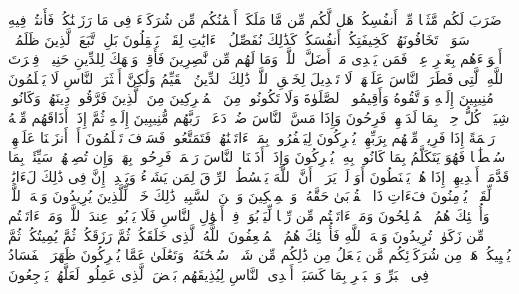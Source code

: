 \stopbuffer
\startbuffer[\q:30:28]
ضَرَبَ لَكُم مَّثَلࣰا مِّنۡ أَنفُسِكُمۡۖ هَل لَّكُم مِّن مَّا مَلَكَتۡ أَیۡمَٰنُكُم مِّن شُرَكَاۤءَ فِی مَا رَزَقۡنَٰكُمۡ فَأَنتُمۡ فِیهِ سَوَاۤءࣱ تَخَافُونَهُمۡ كَخِیفَتِكُمۡ أَنفُسَكُمۡۚ كَذَٰلِكَ نُفَصِّلُ ٱلۡءَایَٰتِ لِقَوۡمࣲ یَعۡقِلُونَ%
\stopbuffer
\startbuffer[\q:30:29]
بَلِ ٱتَّبَعَ ٱلَّذِینَ ظَلَمُوۤا۟ أَهۡوَاۤءَهُم بِغَیۡرِ عِلۡمࣲۖ فَمَن یَهۡدِی مَنۡ أَضَلَّ ٱللَّهُۖ وَمَا لَهُم مِّن نَّٰصِرِینَ%
\stopbuffer
\startbuffer[\q:30:30]
فَأَقِمۡ وَجۡهَكَ لِلدِّینِ حَنِیفࣰاۚ فِطۡرَتَ ٱللَّهِ ٱلَّتِی فَطَرَ ٱلنَّاسَ عَلَیۡهَاۚ لَا تَبۡدِیلَ لِخَلۡقِ ٱللَّهِۚ ذَٰلِكَ ٱلدِّینُ ٱلۡقَیِّمُ وَلَٰكِنَّ أَكۡثَرَ ٱلنَّاسِ لَا یَعۡلَمُونَ%
\stopbuffer
\startbuffer[\q:30:31]
۞ مُنِیبِینَ إِلَیۡهِ وَٱتَّقُوهُ وَأَقِیمُوا۟ ٱلصَّلَوٰةَ وَلَا تَكُونُوا۟ مِنَ ٱلۡمُشۡرِكِینَ%
\stopbuffer
\startbuffer[\q:30:32]
مِنَ ٱلَّذِینَ فَرَّقُوا۟ دِینَهُمۡ وَكَانُوا۟ شِیَعࣰاۖ كُلُّ حِزۡبِۭ بِمَا لَدَیۡهِمۡ فَرِحُونَ%
\stopbuffer
\startbuffer[\q:30:33]
وَإِذَا مَسَّ ٱلنَّاسَ ضُرࣱّ دَعَوۡا۟ رَبَّهُم مُّنِیبِینَ إِلَیۡهِ ثُمَّ إِذَاۤ أَذَاقَهُم مِّنۡهُ رَحۡمَةً إِذَا فَرِیقࣱ مِّنۡهُم بِرَبِّهِمۡ یُشۡرِكُونَ%
\stopbuffer
\startbuffer[\q:30:34]
لِیَكۡفُرُوا۟ بِمَاۤ ءَاتَیۡنَٰهُمۡۚ فَتَمَتَّعُوا۟ فَسَوۡفَ تَعۡلَمُونَ%
\stopbuffer
\startbuffer[\q:30:35]
أَمۡ أَنزَلۡنَا عَلَیۡهِمۡ سُلۡطَٰنࣰا فَهُوَ یَتَكَلَّمُ بِمَا كَانُوا۟ بِهِۦ یُشۡرِكُونَ%
\stopbuffer
\startbuffer[\q:30:36]
وَإِذَاۤ أَذَقۡنَا ٱلنَّاسَ رَحۡمَةࣰ فَرِحُوا۟ بِهَاۖ وَإِن تُصِبۡهُمۡ سَیِّئَةُۢ بِمَا قَدَّمَتۡ أَیۡدِیهِمۡ إِذَا هُمۡ یَقۡنَطُونَ%
\stopbuffer
\startbuffer[\q:30:37]
أَوَ لَمۡ یَرَوۡا۟ أَنَّ ٱللَّهَ یَبۡسُطُ ٱلرِّزۡقَ لِمَن یَشَاۤءُ وَیَقۡدِرُۚ إِنَّ فِی ذَٰلِكَ لَءَایَٰتࣲ لِّقَوۡمࣲ یُؤۡمِنُونَ%
\stopbuffer
\startbuffer[\q:30:38]
فَءَاتِ ذَا ٱلۡقُرۡبَىٰ حَقَّهُۥ وَٱلۡمِسۡكِینَ وَٱبۡنَ ٱلسَّبِیلِۚ ذَٰلِكَ خَیۡرࣱ لِّلَّذِینَ یُرِیدُونَ وَجۡهَ ٱللَّهِۖ وَأُو۟لَٰۤئِكَ هُمُ ٱلۡمُفۡلِحُونَ%
\stopbuffer
\startbuffer[\q:30:39]
وَمَاۤ ءَاتَیۡتُم مِّن رِّبࣰا لِّیَرۡبُوَا۟ فِیۤ أَمۡوَٰلِ ٱلنَّاسِ فَلَا یَرۡبُوا۟ عِندَ ٱللَّهِۖ وَمَاۤ ءَاتَیۡتُم مِّن زَكَوٰةࣲ تُرِیدُونَ وَجۡهَ ٱللَّهِ فَأُو۟لَٰۤئِكَ هُمُ ٱلۡمُضۡعِفُونَ%
\stopbuffer
\startbuffer[\q:30:40]
ٱللَّهُ ٱلَّذِی خَلَقَكُمۡ ثُمَّ رَزَقَكُمۡ ثُمَّ یُمِیتُكُمۡ ثُمَّ یُحۡیِیكُمۡۖ هَلۡ مِن شُرَكَاۤئِكُم مَّن یَفۡعَلُ مِن ذَٰلِكُم مِّن شَیۡءࣲۚ سُبۡحَٰنَهُۥ وَتَعَٰلَىٰ عَمَّا یُشۡرِكُونَ%
\stopbuffer
\startbuffer[\q:30:41]
ظَهَرَ ٱلۡفَسَادُ فِی ٱلۡبَرِّ وَٱلۡبَحۡرِ بِمَا كَسَبَتۡ أَیۡدِی ٱلنَّاسِ لِیُذِیقَهُم بَعۡضَ ٱلَّذِی عَمِلُوا۟ لَعَلَّهُمۡ یَرۡجِعُونَ%
\stopbuffer
